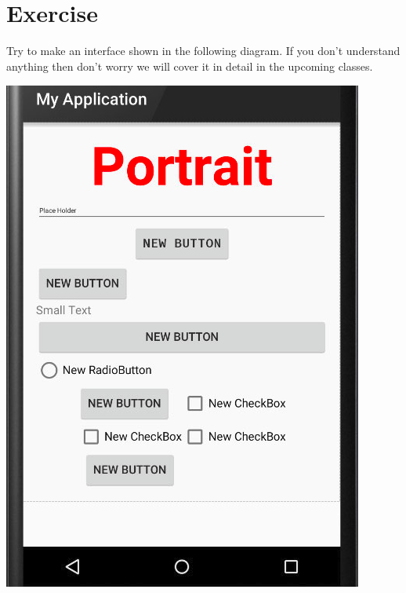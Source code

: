 \section{Exercise}
Try to make an interface shown in the following diagram. If you don't understand anything then don't worry we will cover it in detail in the upcoming classes.

\begin{center}
	\includegraphics[scale=0.4]{chapters/ch02/images/25_activity1}
\end{center}